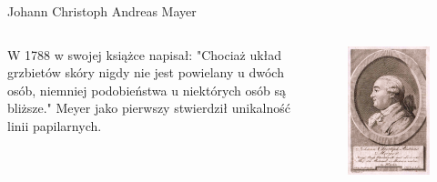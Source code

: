 \documentclass{beamer}
\begin{document}
\begin{frame}{Johann Christoph Andreas Mayer}
\begin{columns}
    \begin{column}[T]{.6\textwidth}
    \justifying
        \begin{center}
            W 1788 w swojej książce napisał: "Chociaż układ grzbietów skóry nigdy nie jest powielany u dwóch osób, niemniej podobieństwa u niektórych osób są bliższe." Meyer jako pierwszy stwierdził unikalność linii papilarnych.
        \end{center}
    \end{column}
    \hfill
    \begin{column}[T]{.4\textwidth}
        \begin{figure}
            \centering
            \includegraphics[width=.7\textwidth]{History/meyer.jpg}
        \end{figure}
    \end{column}
\end{columns}
\end{frame}
\end{document}
